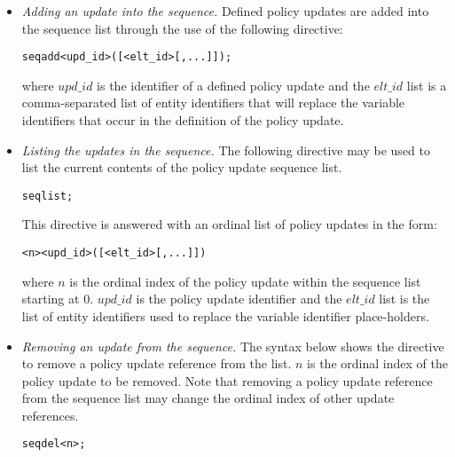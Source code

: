 \documentclass[global,twocolumn,final]{svjour}
\newenvironment{vverbatim}
  {\begin{alltt}}
  {\vspace{-\baselineskip}\end{alltt}}
\begin{document}
        \begin{itemize}
          \item
            {\em Adding an update into the sequence.}
            Defined policy updates are added into the sequence list through the
            use of the following directive:

            \begin{vverbatim}
  seq add <upd\_id>([<elt\_id>[, ...]]);
            \end{vverbatim}

            \noindent where $upd\_id$ is the identifier of a defined policy
            update and the $elt\_id$ list is a comma-separated list of entity
            identifiers that will replace the variable identifiers that occur
            in the definition of the policy update.

          \item
            {\em Listing the updates in the sequence.}
            The following directive may be used to list the current contents of
            the policy update sequence list.

            \begin{vverbatim}
  seq list;
            \end{vverbatim}

            This directive is answered with an ordinal list of policy updates
            in the form:

            \begin{vverbatim}
  <n> <upd\_id>([<elt\_id>[, ...]])
            \end{vverbatim}

            \noindent where $n$ is the ordinal index of the policy update
            within the sequence list starting at 0. $upd\_id$ is the policy
            update identifier and the $elt\_id$ list is the list of entity
            identifiers used to replace the variable identifier place-holders.

          \item
            {\em Removing an update from the sequence.}
            The syntax below shows the directive to remove a policy update
            reference from the list. $n$ is the ordinal index of the policy
            update to be removed. Note that removing a policy update reference
            from the sequence list may change the ordinal index of other update
            references.

            \begin{vverbatim}
  seq del <n>;
            \end{vverbatim}


\end{itemize}
\end{document}
